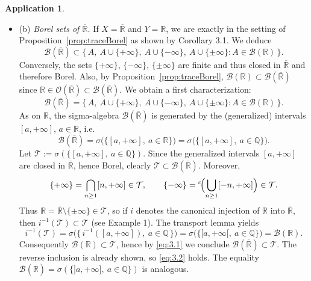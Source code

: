 \documentclass[11pt]{article}
\theoremstyle{definition}
\newtheorem{application}{Application}[section]
\begin{document}
\begin{application}
\begin{itemize}
\item (b) \emph{Borel sets of $\overline{\mathbb R}$.}
If $X=\overline{\mathbb R}$ and $Y=\mathbb R$, we are exactly in the setting of Proposition~\ref{prop:traceBorel} as shown by Corollary 3.1. We deduce
\[
\mathcal B(\overline{\mathbb R})\subset\{\,A,\ A\cup\{+\infty\},\ A\cup\{-\infty\},\ A\cup\{\pm\infty\}: A\in\mathcal B(\mathbb R)\,\}.
\]
Conversely, the sets $\{+\infty\}$, $\{-\infty\}$, $\{\pm\infty\}$ are finite and thus closed in $\overline{\mathbb R}$ and therefore Borel. Also, by Proposition~\ref{prop:traceBorel}, $\mathcal B(\mathbb R)\subset \mathcal B(\overline{\mathbb R})$ since $\mathbb R\in\mathcal O(\overline{\mathbb R})\subset\mathcal B(\overline{\mathbb R})$. We obtain a first characterization:
\begin{equation}\label{eq:3.1}
\mathcal B(\overline{\mathbb R})=\{\,A,\ A\cup\{+\infty\},\ A\cup\{-\infty\},\ A\cup\{\pm\infty\}: A\in\mathcal B(\mathbb R)\,\}.
\end{equation}
As on $\mathbb R$, the sigma-algebra $\mathcal B(\overline{\mathbb R})$ is generated by the (generalized) intervals $[a,+\infty]$, $a\in\mathbb R$, i.e.
\begin{equation}\label{eq:3.2}
\mathcal B(\overline{\mathbb R})=\sigma\bigl(\{[a,+\infty],\ a\in\mathbb R\}\bigr)=\sigma\bigl(\{[a,+\infty],\ a\in\mathbb Q\}\bigr).
\end{equation}
Let $\mathcal T:=\sigma(\{[a,+\infty],\ a\in\mathbb Q\})$. Since the generalized intervals $[a,+\infty]$ are closed in $\overline{\mathbb R}$, hence Borel, clearly $\mathcal T\subset\mathcal B(\overline{\mathbb R})$. Moreover,
\[
\{+\infty\}=\bigcap_{n\ge1} [n,+\infty]\in\mathcal T,
\qquad
\{-\infty\}={}^c\!\Bigl(\bigcup_{n\ge1}[-n,+\infty]\Bigr)\in\mathcal T.
\]
Thus $\mathbb R=\overline{\mathbb R}\setminus\{\pm\infty\}\in\mathcal T$, so if $i$ denotes the canonical injection of $\mathbb R$ into $\overline{\mathbb R}$, then $i^{-1}(\mathcal T)\subset\mathcal T$ (see Example 1). The transport lemma yields
\[
i^{-1}(\mathcal T)
= \sigma\bigl(\{\,i^{-1}([a,+\infty]),\ a\in\mathbb Q\,\}\bigr)
= \sigma\bigl(\{[a,+\infty[,\ a\in\mathbb Q\}\bigr)
= \mathcal B(\mathbb R).
\]
Consequently $\mathcal B(\mathbb R)\subset\mathcal T$, hence by \eqref{eq:3.1} we conclude $\mathcal B(\overline{\mathbb R})\subset\mathcal T$. The reverse inclusion is already shown, so \eqref{eq:3.2} holds. The equality $\mathcal B(\overline{\mathbb R})=\sigma(\{]a,+\infty],\ a\in\mathbb Q\})$ is analogous.
\end{itemize}
\end{application}
\end{document}
